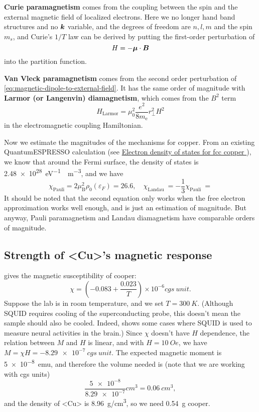 \documentclass[hyperref, a4paper]{article}
\newcommand*{\concept}[1]{{\textbf{#1}}}
\def\ce#1{<#1>}%
\begin{document}
\concept{Curie paramagnetism} comes from the coupling 
between the spin and the external magnetic field 
of localized electrons.
Here we no longer hand band structures and no $\vb*{k}$ variable, 
and the degrees of freedom are $n, l, m$ and the spin $m_s$,
and Curie's $1 / T$ law can be derived by putting the first-order perturbation of
\begin{equation}
    H = - \vb*{\mu} \cdot \vb*{B} 
    \label{eq:magnetic-dipole-to-external-field}
\end{equation}
into the partition function.

\concept{Van Vleck paramagnetism} comes from 
the second order perturbation of \eqref{eq:magnetic-dipole-to-external-field}.
It has the same order of magnitude with 
\concept{Larmor (or Langenvin) diamagnetism},
which comes from the $B^2$ term 
\begin{equation}
    H_{\text{Larmor}} = \mu_0^2 \frac{e^2}{8 m_{\mathrm{e}}} r_{\perp}^2 H^2
\end{equation}
in the electromagnetic coupling Hamiltonian.

Now we estimate the magnitudes of the mechanisms for copper.
From an existing QuantumESPRESSO calculation 
(see \href{http://lampx.tugraz.at/~hadley/ss1/materials/dos/fccCu_dos.html}{Electron density of states for fcc copper
}),
we know that around the Fermi surface, 
the density of states is \SI{2.48e28}{eV^{-1} \cdot m^{-3}},
and we have 
\begin{equation}
    \chi_{\text {Pauli}}=2 \mu_{\mathrm{B}}^2 \rho_0\left(\varepsilon_F\right)
    = 26.6 , \quad 
    \chi_{\text {Landau }}=-\frac{1}{3} \chi_{\text {Pauli }} = 
\end{equation}
It should be noted that the second equation only works 
when the free electron approximation works well enough, 
and is just an estimation of magnitude. 
But anyway, Pauli paramagnetism 
and Landau diamagnetism 
have comparable orders of magnitude.

\subsection{Strength of \ce{Cu}'s magnetic response}

\cite{cooper_magnetic} gives the magnetic susceptibility of cooper:
\begin{equation}
    \chi=\left(-0.083+\frac{0.023}{T}\right) \times 10^{-6} \unit{cgs\ unit}.
\end{equation}
Suppose the lab is in room temperature, 
and we set $T = \SI{300}{K}$.
(Although SQUID requires cooling of the superconducting probe, 
this doesn't mean the sample should also be cooled. 
Indeed, \cite{singh2014magnetoencephalography} shows 
some cases where SQUID is used to measure 
neural activities in the brain.)
Since $\chi$ doesn't have $H$ dependence,
the relation between $M$ and $H$ is linear,
and with $H = \SI{10}{Oe}$,
we have $M = \chi H = \SI{-8.29e-7}{cgs\ unit}$.
The expected magnetic moment is \SI{5e-8}{emu}, 
and therefore the volume needed is (note that we are working with cgs units)
\[
    \frac{\num{5e-8}}{\num{8.29e-7}} \unit{cm^3} = \SI{0.06}{cm^3},
\]
and the density of \ce{Cu} is \SI{8.96}{g/cm^3},
so we need \SI{0.54}{g} cooper.
\end{document}

